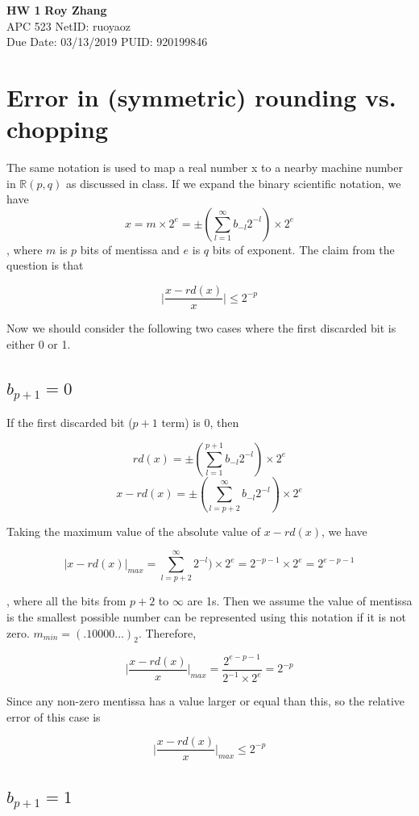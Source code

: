 \documentclass[a4paper, 12pt]{article}
\begin{document}
\noindent
\large\textbf{HW 1} \hfill \textbf{Roy Zhang} \\
\normalsize APC 523 \hfill NetID: ruoyaoz \\
Due Date: 03/13/2019 \hfill PUID: 920199846\\

\section{Error in (symmetric) rounding vs. chopping}
The same notation is used to map a real number x to a nearby machine number in $\mathbb{R}(p,q)$ as discussed in class. If we expand the binary scientific notation, we have
\[x = m \times 2^e = \pm (\sum ^\infty _{l=1} b_{-l}2^{-l})\times 2^e \]
, where $m$ is $p$ bits of mentissa and $e$ is $q$ bits of exponent. The claim from the question is that

\[\vert \frac{x-rd(x)}{x} \vert \leq 2^{-p} \]

Now we should consider the following two cases where the first discarded bit is either 0 or 1.

\subsection{$b_{p+1}=0$}

If the first discarded bit ($p+1$ term) is 0, then

\[rd(x) = \pm (\sum ^{p+1} _{l=1} b_{-l}2^{-l})\times 2^e\]
\[x-rd(x) = \pm (\sum ^\infty _{l=p+2} b_{-l}2^{-l})\times 2^e\]

Taking the maximum value of the absolute value of $x-rd(x)$, we have

\[\vert x-rd(x) \vert _{max}=\sum ^\infty _{l=p+2} 2^{-l})\times 2^e = 2^{-p-1}\times 2^e = 2^{e-p-1}\]

, where all the bits from $p+2$ to $\infty$ are 1s. Then we assume the value of mentissa is the smallest possible number can be represented using this notation if it is not zero. $m_{min} = (.10000...)_2$. Therefore,

\[\vert \frac{x-rd(x)}{x} \vert _{max} = \frac{2^{e-p-1}}{2^{-1}\times 2^e} = 2^{-p}\]

Since any non-zero mentissa has a value larger or equal than this, so the relative error of this case is

\[\vert \frac{x-rd(x)}{x} \vert _{max} \leq 2^{-p}\]



\subsection{$b_{p+1}=1$}
\end{document}
